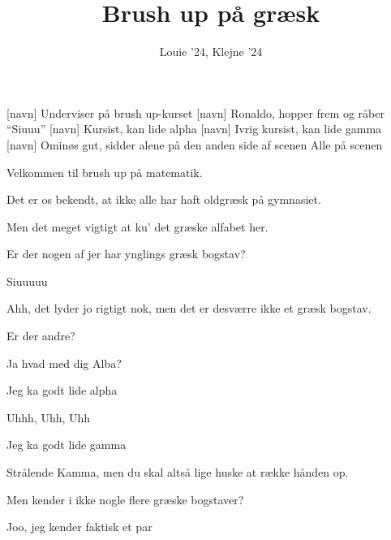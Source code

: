 \documentclass[a4paper,11pt]{article}
\title{Brush up på græsk}
\author{Louie '24, Klejne '24}
\begin{document}
\maketitle

\begin{roles}
[navn] Underviser på brush up-kurset
[navn] Ronaldo, hopper frem og råber ``Siuuu''
[navn] Kursist, kan lide alpha
[navn] Ivrig kursist, kan lide gamma
[navn] Ominøs gut, sidder alene på den anden side af scenen
 Alle på scenen
\end{roles}

\begin{sketch}

 Velkommen til brush up på matematik.

 Det er os bekendt, at ikke alle har haft oldgræsk på gymnasiet.

 Men det meget vigtigt at ku' det græske alfabet her.

 Er der nogen af jer har ynglings græsk bogstav?


 Siuuuuu

 Ahh, det lyder jo rigtigt nok, men det er desværre ikke et græsk bogstav.


 Er der andre?

 Ja hvad med dig Alba?

 Jeg ka godt lide alpha

 Uhhh, Uhh, Uhh

 Jeg ka godt lide gamma

 Strålende Kamma, men du skal altså lige huske at række hånden op.

 Men kender i ikke nogle flere græske bogstaver?


 Joo, jeg kender faktisk et par

\end{sketch}
\end{document}
